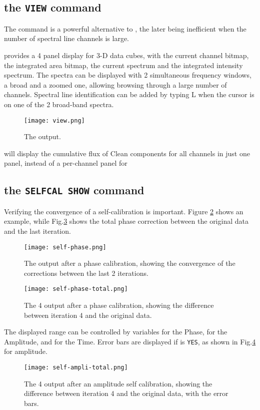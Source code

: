 \subsection{the \texttt{VIEW} command}

The  command is a powerful alternative to , the
later being inefficient when the number of spectral line channels
is large. 

 provides a 4 panel display for 3-D data cubes, with
the current channel bitmap, the integrated area bitmap, the current
spectrum and the integrated intensity spectrum.  The spectra
can be displayed with 2 simultaneous frequency windows, a broad
and a zoomed one, allowing browsing through a large number of
channels. Spectral line identification can be added by typing
L when the cursor is on one of the 2 broad-band spectra.

\begin{figure}
  \centering
  \texttt{[image: view.png]}
  \caption{The  output.
\label{fig:view}}
\end{figure}

 will display the cumulative flux of Clean components
for all channels in just one panel, instead of a per-channel panel
for 


\subsection{the \texttt{SELFCAL SHOW} command}

Verifying the convergence of a self-calibration is important.
Figure \ref{fig:selfphase} shows an example, while Fig.\ref{fig:selftot}
shows the total phase correction between the original data and
the last iteration. 
\begin{figure}
  \centering
  \texttt{[image: self-phase.png]}
  \caption{The  output after a phase calibration,
  showing the convergence of the corrections between the last 2
  iterations.
\label{fig:selfphase}}
\end{figure}
\begin{figure}
  \centering
  \texttt{[image: self-phase-total.png]}
  \caption{The  4 output after a phase calibration,
  showing the difference between iteration 4 and the original
  data.  
\label{fig:selftot}}
\end{figure}

The displayed range can be controlled
by variables  for the Phase, 
 for the Amplitude, and  
for the Time. Error bars are displayed if  is \texttt{YES},
as shown in Fig.\ref{fig:selfamp} for amplitude.
\begin{figure}
  \centering
  \texttt{[image: self-ampli-total.png]}
  \caption{The  4 output after an amplitude self calibration,
  showing the difference between iteration 4 and the original
  data, with the error bars.  
\label{fig:selfamp}}
\end{figure}
